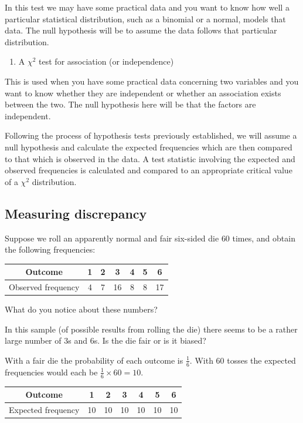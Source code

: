 \documentclass[
]{book}
\providecommand{\tightlist}{%
  \setlength{\itemsep}{0pt}\setlength{\parskip}{0pt}}
\theoremstyle{definition}
\theoremstyle{definition}
\theoremstyle{definition}
\theoremstyle{definition}
\theoremstyle{remark}
\begin{document}
In this test we may have some practical data and you want to know how well a particular statistical distribution, such as a binomial or a normal, models that data. The null hypothesis will be to assume the data follows that particular distribution.

\begin{enumerate}
\def\labelenumi{\arabic{enumi}.}
\setcounter{enumi}{1}
\tightlist
\item
  A \(\chi^2\) test for association (or independence)
\end{enumerate}

This is used when you have some practical data concerning two variables and you want to know whether they are independent or whether an association exists between the two. The null hypothesis here will be that the factors are independent.

Following the process of hypothesis tests previously established, we will assume a null hypothesis and calculate the expected frequencies which are then compared to that which is observed in the data. A test statistic involving the expected and observed frequencies is calculated and compared to an appropriate critical value of a \(\chi^2\) distribution.

\hypertarget{measuring-discrepancy}{%
\subsection{Measuring discrepancy}\label{measuring-discrepancy}}

Suppose we roll an apparently normal and fair six-sided die \(60\) times, and obtain the following frequencies:

\begin{longtable}[]{@{}ccccccc@{}}
\toprule
Outcome & 1 & 2 & 3 & 4 & 5 & 6\tabularnewline
\midrule
\endhead
Observed frequency & 4 & 7 & 16 & 8 & 8 & 17\tabularnewline
\bottomrule
\end{longtable}

What do you notice about these numbers?

In this sample (of possible results from rolling the die) there seems to be a rather large number of \(3\)s and \(6\)s. Is the die fair or is it biased?

With a fair die the probability of each outcome is \(\frac{1}{6}\). With \(60\) tosses the expected frequencies would each be \(\frac{1}{6}\times 60=10\).

\begin{longtable}[]{@{}ccccccc@{}}
\toprule
Outcome & 1 & 2 & 3 & 4 & 5 & 6\tabularnewline
\midrule
\endhead
Expected frequency & 10 & 10 & 10 & 10 & 10 & 10\tabularnewline
\bottomrule
\end{longtable}
\end{document}
